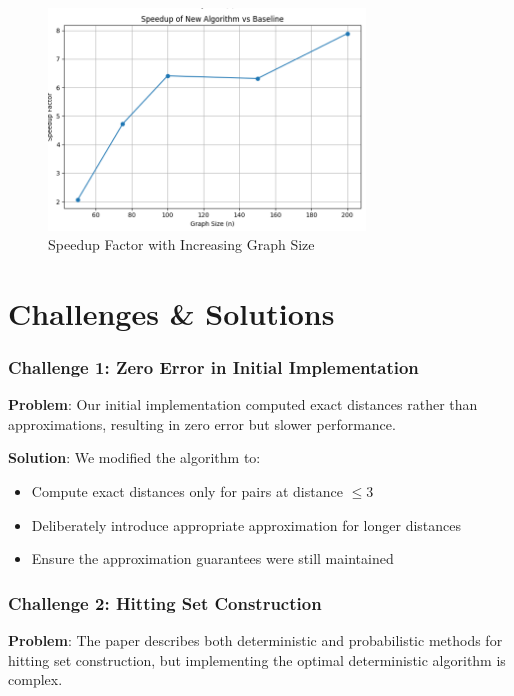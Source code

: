 \documentclass[a4paper,11pt,oneside]{book}
\begin{document}
\begin{figure}[h]
\centering
\includegraphics[width=0.75\textwidth]{figures/speedup.png}
\caption{Speedup Factor with Increasing Graph Size}
\end{figure}

\part{Challenges \& Solutions}

\section*{Challenge 1: Zero Error in Initial Implementation}

\textbf{Problem}: Our initial implementation computed exact distances rather than approximations, resulting in zero error but slower performance.

\textbf{Solution}: We modified the algorithm to:
\begin{itemize}
    \item Compute exact distances only for pairs at distance $\leq 3$
    \item Deliberately introduce appropriate approximation for longer distances
    \item Ensure the approximation guarantees were still maintained
\end{itemize}

\section*{Challenge 2: Hitting Set Construction}

\textbf{Problem}: The paper describes both deterministic and probabilistic methods for hitting set construction, but implementing the optimal deterministic algorithm is complex.
\end{document}

